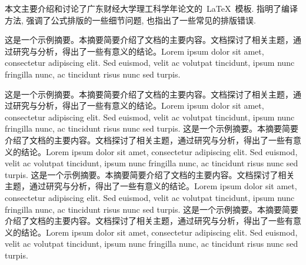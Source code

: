 

本文主要介绍和讨论了广东财经大学理工科学年论文的~\LaTeX~模板.
指明了编译方法, 强调了公式排版的一些细节问题, 也指出了一些常见的排版错误.\the\baselineskip

这是一个示例摘要。本摘要简要介绍了文档的主要内容。文档探讨了相关主题，通过研究与分析，得出了一些有意义的结论。Lorem ipsum dolor sit amet, consectetur adipiscing elit. Sed euismod, velit ac volutpat tincidunt, ipsum nunc fringilla nunc, ac tincidunt risus nunc sed turpis.\the\baselineskip

这是一个示例摘要。本摘要简要介绍了文档的主要内容。文档探讨了相关主题，通过研究与分析，得出了一些有意义的结论。Lorem ipsum dolor sit amet, consectetur adipiscing elit. Sed euismod, velit ac volutpat tincidunt, ipsum nunc fringilla nunc, ac tincidunt risus nunc sed turpis.
这是一个示例摘要。本摘要简要介绍了文档的主要内容。文档探讨了相关主题，通过研究与分析，得出了一些有意义的结论。Lorem ipsum dolor sit amet, consectetur adipiscing elit. Sed euismod, velit ac volutpat tincidunt, ipsum nunc fringilla nunc, ac tincidunt risus nunc sed turpis.
这是一个示例摘要。本摘要简要介绍了文档的主要内容。文档探讨了相关主题，通过研究与分析，得出了一些有意义的结论。Lorem ipsum dolor sit amet, consectetur adipiscing elit. Sed euismod, velit ac volutpat tincidunt, ipsum nunc fringilla nunc, ac tincidunt risus nunc sed turpis.
这是一个示例摘要。本摘要简要介绍了文档的主要内容。文档探讨了相关主题，通过研究与分析，得出了一些有意义的结论。Lorem ipsum dolor sit amet, consectetur adipiscing elit. Sed euismod, velit ac volutpat tincidunt, ipsum nunc fringilla nunc, ac tincidunt risus nunc sed turpis.\the\baselineskip

